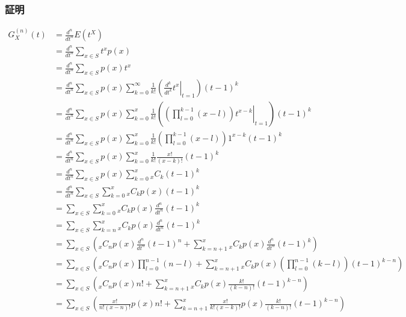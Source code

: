 \documentclass[dvipdfmx]{jsarticle}
\begin{document}
 \subsubsection{証明}
 \begin{align}
  G_X^{\left(n\right)}\left(t\right)&=\frac{d^n}{dt^n}E\left(t^X\right)\nonumber\\
  &=\frac{d^n}{dt^n}\sum_{x\in S}t^xp\left(x\right)\nonumber\\
  &=\frac{d^n}{dt^n}\sum_{x\in S}p\left(x\right)t^x\nonumber\\
  &=\frac{d^n}{dt^n}\sum_{x\in S}p\left(x\right)\sum_{k=0}^\infty\frac{1}{k!}\left(\left.\frac{d^k}{dt^k}t^x\right|_{t=1}\right)\left(t-1\right)^k\nonumber\\
  &=\frac{d^n}{dt^n}\sum_{x\in S}p\left(x\right)\sum_{k=0}^x\frac{1}{k!}\left(\left.\left(\prod_{l=0}^{k-1}\left(x-l\right)\right)t^{x-k}\right|_{t=1}\right)\left(t-1\right)^k\nonumber\\
  &=\frac{d^n}{dt^n}\sum_{x\in S}p\left(x\right)\sum_{k=0}^x\frac{1}{k!}\left(\prod_{l=0}^{k-1}\left(x-l\right)\right)1^{x-k}\left(t-1\right)^k\nonumber\\
  &=\frac{d^n}{dt^n}\sum_{x\in S}p\left(x\right)\sum_{k=0}^x\frac{1}{k!}\frac{x!}{\left(x-k\right)!}\left(t-1\right)^k\nonumber\\
  &=\frac{d^n}{dt^n}\sum_{x\in S}p\left(x\right)\sum_{k=0}^x{}_xC_k\left(t-1\right)^k\nonumber\\
  &=\frac{d^n}{dt^n}\sum_{x\in S}\sum_{k=0}^x{}_xC_kp\left(x\right)\left(t-1\right)^k\nonumber\\
  &=\sum_{x\in S}\sum_{k=0}^x{}_xC_kp\left(x\right)\frac{d^n}{dt^n}\left(t-1\right)^k\nonumber\\
  &=\sum_{x\in S}\sum_{k=n}^x{}_xC_kp\left(x\right)\frac{d^n}{dt^n}\left(t-1\right)^k\nonumber\\
  &=\sum_{x\in S}\left({}_xC_np\left(x\right)\frac{d^n}{dt^n}\left(t-1\right)^n+\sum_{k=n+1}^x{}_xC_kp\left(x\right)\frac{d^n}{dt^n}\left(t-1\right)^k\right)\nonumber\\
  &=\sum_{x\in S}\left({}_xC_np\left(x\right)\prod_{l=0}^{n-1}\left(n-l\right)+\sum_{k=n+1}^x{}_xC_kp\left(x\right)\left(\prod_{l=0}^{n-1}\left(k-l\right)\right)\left(t-1\right)^{k-n}\right)\nonumber\\
  &=\sum_{x\in S}\left({}_xC_np\left(x\right)n!+\sum_{k=n+1}^x{}_xC_kp\left(x\right)\frac{k!}{\left(k-n\right)!}\left(t-1\right)^{k-n}\right)\nonumber\\
  &=\sum_{x\in S}\left(\frac{x!}{n!\left(x-n\right)!}p\left(x\right)n!+\sum_{k=n+1}^x\frac{x!}{k!\left(x-k\right)!}p\left(x\right)\frac{k!}{\left(k-n\right)!}\left(t-1\right)^{k-n}\right)\nonumber\\

\end{align}
\end{document}
